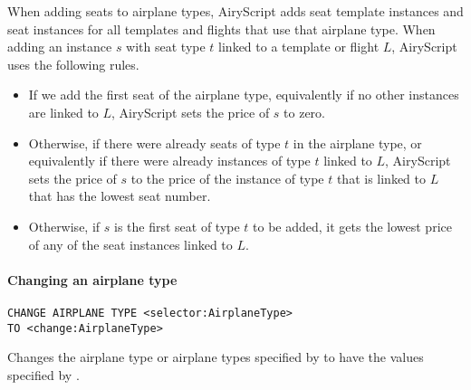 When adding seats to airplane types, AiryScript adds seat template instances and
seat instances for all templates and flights that use that airplane type. 
When adding an instance $s$ with seat type $t$ linked to a template or flight
$L$, AiryScript uses the following rules.
\begin{itemize}
  \item If we add the first seat of the airplane type, equivalently if no other
    instances are linked to $L$, AiryScript sets the price of $s$ to zero.
  \item Otherwise, if there were already seats of type $t$ in the airplane type,
    or equivalently if there were already instances of type $t$ linked to $L$,
    AiryScript sets the price of $s$ to the price of the instance of type $t$
    that is linked to $L$ that has the lowest seat number.
  \item Otherwise, if $s$ is the first seat of type $t$ to be added, it gets the
    lowest price of any of the seat instances linked to $L$.
\end{itemize}

\paragraph{Changing an airplane type}
\begin{operation}
  \begin{lstlisting}
CHANGE AIRPLANE TYPE <selector:AirplaneType>
TO <change:AirplaneType>
  \end{lstlisting}
\end{operation}
Changes the airplane type or airplane types specified by  to have
the values specified by .

